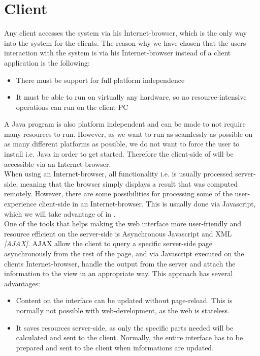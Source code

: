 
\section{Client}
Any client accesses the system via his Internet-browser, which is the only way into the system for the clients. 
The reason why we have chosen that the users interaction with the system is via his Internet-browser instead of a client application is the following:

\begin{itemize}
	\item There must be support for full platform independence
	\item It must be able to run on virtually any hardware, so no resource-intensive operations can run on the client PC
\end{itemize}

A Java program is also platform independent and can be made to not require many resources to run. 
However, as we want \projectname{} to run as seamlessly as possible on as many different platforms as possible, we do not want to force the user to install i.e. Java in order to get started.
Therefore the client-side of \projectname{} will be accessible via an Internet-browser. \\

When using an Internet-browser, all functionality i.e. is usually processed server-side, meaning that the browser simply displays a result that was computed remotely. 
However, there are some possibilities for processing some of the user-experience client-side in an Internet-browser. 
This is usually done via Javascript, which we will take advantage of in \projectname{}. \\

One of the tools that helps making the web interface more user-friendly and resource efficient on the server-side is Asynchronous Javascript and XML \emph{[AJAX]}. 
AJAX allow the client to query a specific server-side page asynchronously from the rest of the page, and via Javascript executed on the clients Internet-browser, handle the output from the server and attach the information to the view in an appropriate way. 
This approach has several advantages:

\begin{itemize}
	\item Content on the interface can be updated without page-reload. This is normally not possible with web-development, as the web is stateless.
	\item It saves resources server-side, as only the specific parts needed will be calculated and sent to the client. Normally, the entire interface has to be prepared and sent to the client when informations are updated.
\end{itemize}

